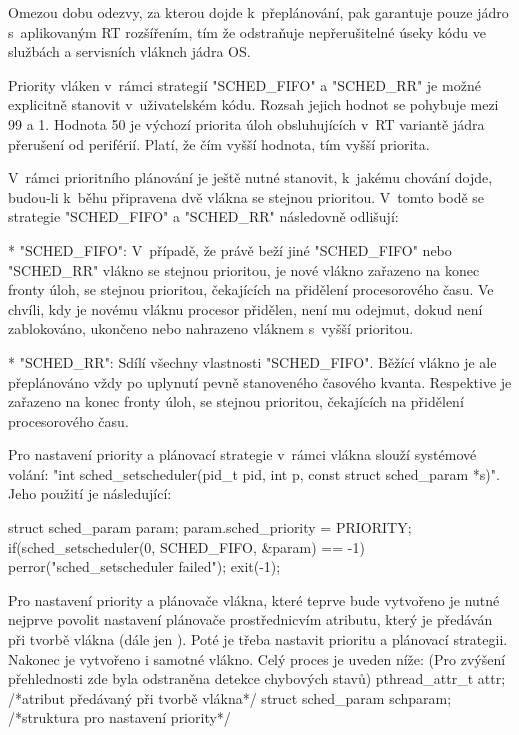 Omezou dobu odezvy, za kterou dojde k~přeplánování, pak garantuje pouze jádro s~aplikovaným RT rozšířením, tím že odstraňuje nepřerušitelné úseky kódu ve službách a servisních vláknch jádra OS.

Priority vláken v~rámci strategií "SCHED_FIFO" a "SCHED_RR" je možné explicitně stanovit v~uživatelském kódu. Rozsah jejich hodnot se pohybuje mezi 99 a 1. Hodnota 50 je výchozí priorita úloh obsluhujících v~RT variantě jádra přerušení od periférií. Platí, že čím vyšší hodnota, tím vyšší priorita. 

V~rámci prioritního plánování je ještě nutné stanovit, k~jakému chování dojde, budou-li k~běhu připravena dvě vlákna se stejnou prioritou. V~tomto bodě se strategie "SCHED_FIFO" a "SCHED_RR" následovně odlišují: 


\begitems 

* "SCHED_FIFO":  V~případě, že právě beží jiné "SCHED_FIFO" nebo "SCHED_RR" vlákno se stejnou prioritou, je nové vlákno zařazeno na konec fronty úloh, se stejnou prioritou, čekajících na přidělení procesorového času. Ve chvíli, kdy je novému vláknu procesor přidělen, není mu odejmut, dokud není zablokováno, ukončeno nebo nahrazeno vláknem s~vyšší prioritou. 

* "SCHED_RR": Sdílí všechny vlastnosti "SCHED_FIFO". Běžící vlákno je ale přeplánováno vždy po uplynutí pevně stanoveného časového kvanta. Respektive je zařazeno na konec fronty úloh, se stejnou prioritou, čekajících na přidělení procesorového času.
\enditems

Pro nastavení priority a plánovací strategie v~rámci vlákna slouží systémové volání: "int sched_setscheduler(pid_t pid, int p, const struct sched_param *s)". Jeho použití je následující:

\begtt
struct sched_param param;
param.sched_priority = PRIORITY;
if(sched_setscheduler(0, SCHED_FIFO, &param) == -1) {
     perror("sched_setscheduler failed");
     exit(-1);
}\endtt

Pro nastavení priority a plánovače vlákna, které teprve bude vytvořeno je nutné nejprve povolit nastavení plánovače prostřednicvím atributu, který je předáván při tvorbě vlákna (dále jen ). Poté je třeba nastavit prioritu a plánovací strategii. Nakonec je vytvořeno i samotné vlákno. Celý proces je uveden níže: (Pro zvýšení přehlednosti zde byla odstraněna detekce chybových stavů)
\begtt
	pthread_attr_t attr; 	       /*atribut předávaný při tvorbě vlákna*/
	struct sched_param schparam;	/*struktura pro nastavení priority*/

